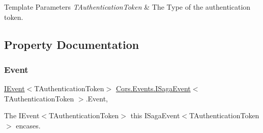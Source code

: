 \begin{DoxyTemplParams}{Template Parameters}
{\em T\+Authentication\+Token} & The Type of the authentication token.\\
\hline
\end{DoxyTemplParams}


\subsection{Property Documentation}
\mbox{\label{interfaceCqrs_1_1Events_1_1ISagaEvent_adc0c41f6a64cadb56d758093c02ef266_adc0c41f6a64cadb56d758093c02ef266}} 
\subsubsection{\texorpdfstring{Event}{Event}}
{\footnotesize\ttfamily \hyperlink{interfaceCqrs_1_1Events_1_1IEvent}{I\+Event}$<$T\+Authentication\+Token$>$ \hyperlink{interfaceCqrs_1_1Events_1_1ISagaEvent}{Cqrs.\+Events.\+I\+Saga\+Event}$<$ T\+Authentication\+Token $>$.Event\hspace{0.3cm}{\ttfamily [get]}, {\ttfamily [set]}}



The I\+Event$<$\+T\+Authentication\+Token$>$ this I\+Saga\+Event$<$\+T\+Authentication\+Token$>$ encases. 

